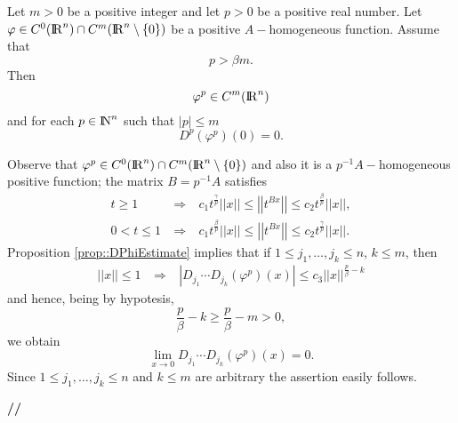 \documentclass[12pt,a4paper]{amsart}
\begin{document}
{\begin{corollary}
Let ${m}>0$ be a positive integer and let
${p}>0$ be a positive real number.
Let ${\varphi}\in C^0({{\rm I\kern-.185em R}}^{n})\cap C^{m}({{\rm I\kern-.185em R}}^{n}\setminus\{0\})$
be a positive ${A}-$homogeneous function.
Assume that
\begin{equation}\nonumber
{p}>{\beta}{m}.
\end{equation}
Then
\begin{equation}\nonumber
{\varphi}^{p}\in C^{m}({{\rm I\kern-.185em R}}^{n})
\end{equation}
and for each ${p}\in{{\rm I\kern-.185em N}}^{n}$ such that
${\left|{p}\right|}\leq{m}$
\begin{equation}\nonumber
{D}^{p}({\varphi}^{p})(0)=0.
\end{equation}
\end{corollary}

{\removelastskip\par\medskip\goodbreak{}}
Observe that
${\varphi}^{p}\in C^0({{\rm I\kern-.185em R}}^{n})\cap C^{m}({{\rm I\kern-.185em R}}^{n}\setminus\{0\})$
and also it is a ${p}^{-1}{A}-$homogeneous positive function;
the matrix ${B}={p}^{-1}{A}$ satisfies
\begin{eqnarray}
	{t}\geq1&\ \Longrightarrow\ &
		{c}_1{t}^\frac{\gamma}{p}{\left|\!\left|{x}\right|\!\right|}
		\leq{\left|\!\left|{{t}^{{B}{x}}}\right|\!\right|}
		\leq{c}_2{t}^\frac{\beta}{p}{\left|\!\left|{x}\right|\!\right|},\\
	0<{t}\leq1&\ \Longrightarrow\ &
		{c}_1{t}^\frac{\beta}{p}{\left|\!\left|{x}\right|\!\right|}
		\leq{\left|\!\left|{{t}^{{B}{x}}}\right|\!\right|}
		\leq{c}_2{t}^\frac{\gamma}{p}{\left|\!\left|{x}\right|\!\right|}.
\end{eqnarray}
Proposition \ref{prop::DPhiEstimate} implies that
if $1\leq{j}_1,\ldots,{j}_{k}\leq{n}$, ${k}\leq{m}$,
then
\begin{eqnarray}
{\left|\!\left|{x}\right|\!\right|}\leq1\ &\Longrightarrow&\ 
{\left|{{D}_{{j}_1}\cdots{D}_{{j}_{k}}({\varphi}^{p})({x})}\right|}
\leq{c}_3{\left|\!\left|{x}\right|\!\right|}^{\frac{p}{\beta}-{k}}
\nonumber
\end{eqnarray}
and hence, being by hypotesis,
\begin{equation}\nonumber
\frac{p}{\beta}-{k}\geq
\frac{p}{\beta}-{m}>0,
\end{equation}
we obtain
\begin{equation}\nonumber
\lim_{x\to0}{D}_{{j}_1}\cdots{D}_{{j}_{k}}({\varphi}^{p})({x})=0.
\end{equation}
Since $1\leq{j}_1,\ldots,{j}_{k}\leq{n}$ and  ${k}\leq{m}$
are arbitrary the assertion easily follows.
{{\bf //}\par\smallskip}

}
\end{document}
